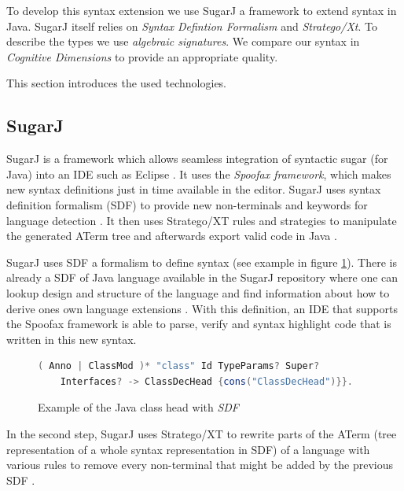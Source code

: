 \documentclass{report}
\begin{document}
To develop this syntax extension we use SugarJ a framework to extend syntax in Java. SugarJ itself relies on \emph{Syntax Defintion Formalism} and \emph{Stratego/Xt}. To describe the types we use \emph{algebraic signatures}. We compare our syntax in \emph{Cognitive Dimensions} to provide an appropriate quality.

This section introduces the used technologies.

\subsection{SugarJ}

SugarJ is a framework which allows seamless integration of syntactic sugar (for Java) into an IDE such as Eclipse \cite{Erdweg-SugarJ-2011}. It uses the \emph{Spoofax framework}, which makes new syntax definitions just in time available in the editor. SugarJ uses syntax definition formalism (SDF) to provide new non-terminals and keywords for language detection \cite{Heering-SDF-1989}. It then uses Stratego/XT rules and strategies to manipulate the generated ATerm tree and afterwards export valid code in Java \cite{Kats-Spoofax-2010, Brand-ATerms-2000}.

SugarJ uses SDF a formalism to define syntax (see example in figure \ref{exampleSDFJavaClassDecHead}). There is already a SDF of Java language available in the SugarJ repository where one can lookup design and structure of the language and find information about how to derive ones own language extensions \cite{Heering-SDF-1989, Brand-SDF-2007, Java-SDF-2014}. With this definition, an IDE that supports the Spoofax framework is able to parse, verify and syntax highlight code that is written in this new syntax.

\begin{figure}[H]
\begin{lstlisting}[language=java,breaklines=false]
( Anno | ClassMod )* "class" Id TypeParams? Super? 
    Interfaces? -> ClassDecHead {cons("ClassDecHead")}}.
\end{lstlisting}
\caption{Example of the Java class head with \emph{SDF} \cite{Java-SDF-2014}}
\label{exampleSDFJavaClassDecHead}
\end{figure}

In the second step, SugarJ uses Stratego/XT to rewrite parts of the ATerm (tree representation of a whole syntax representation in SDF) of a language with various rules to remove every non-terminal that might be added by the previous SDF \cite{Stratego-Manual, Kats-Spoofax-2010, Brand-ATerms-2000, Visser-Stratego-2003}.
\end{document}
